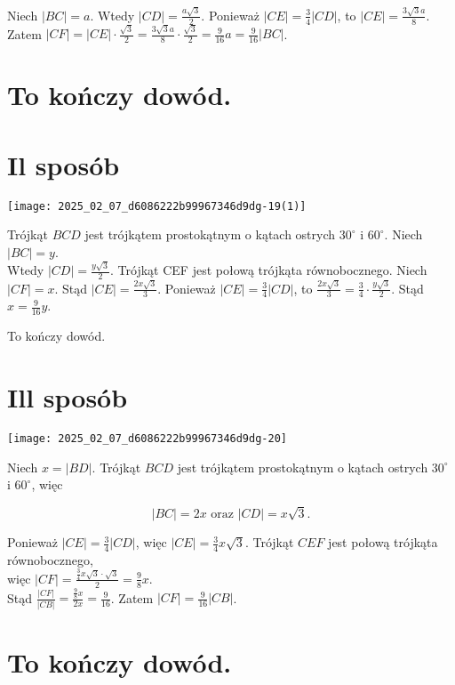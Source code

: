 \documentclass[10pt]{article}
\begin{document}
Niech $|B C|=a$. Wtedy $|C D|=\frac{a \sqrt{3}}{2}$. Ponieważ $|C E|=\frac{3}{4}|C D|$, to $|C E|=\frac{3 \sqrt{3} a}{8}$.\\
Zatem $|C F|=|C E| \cdot \frac{\sqrt{3}}{2}=\frac{3 \sqrt{3} a}{8} \cdot \frac{\sqrt{3}}{2}=\frac{9}{16} a=\frac{9}{16}|B C|$.

\section*{To kończy dowód.}
\section*{Il sposób}
\begin{center}
\texttt{[image: 2025\_02\_07\_d6086222b99967346d9dg-19(1)]}
\end{center}

Trójkąt $B C D$ jest trójkątem prostokątnym o kątach ostrych $30^{\circ}$ i $60^{\circ}$. Niech $|B C|=y$.\\
Wtedy $|C D|=\frac{y \sqrt{3}}{2}$. Trójkąt CEF jest połową trójkąta równobocznego. Niech $|C F|=x$. Stąd $|C E|=\frac{2 x \sqrt{3}}{3}$. Ponieważ $|C E|=\frac{3}{4}|C D|$, to $\frac{2 x \sqrt{3}}{3}=\frac{3}{4} \cdot \frac{y \sqrt{3}}{2}$. Stąd $x=\frac{9}{16} y$.

To kończy dowód.

\section*{Ill sposób}
\begin{center}
\texttt{[image: 2025\_02\_07\_d6086222b99967346d9dg-20]}
\end{center}

Niech $x=|B D|$. Trójkąt $B C D$ jest trójkątem prostokątnym o kątach ostrych $30^{\circ}$ i $60^{\circ}$, więc

$$
|B C|=2 x \text { oraz }|C D|=x \sqrt{3} .
$$

Ponieważ $|C E|=\frac{3}{4}|C D|$, więc $|C E|=\frac{3}{4} x \sqrt{3}$. Trójkąt $C E F$ jest połową trójkąta równobocznego,\\
więc $|C F|=\frac{\frac{3}{4} x \sqrt{3} \cdot \sqrt{3}}{2}=\frac{9}{8} x$.\\
Stąd $\frac{|C F|}{|C B|}=\frac{\frac{9}{8} x}{2 x}=\frac{9}{16}$. Zatem $|C F|=\frac{9}{16}|C B|$.

\section*{To kończy dowód.}
\end{document}
